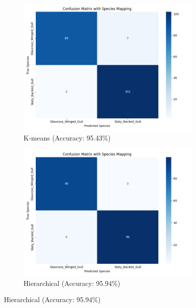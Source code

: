 \documentclass[a4paper,12pt]{report}
\begin{document}
\begin{figure}[H]
    \centering
    \begin{subfigure}[b]{0.32\textwidth}
        \centering
        \includegraphics[width=\textwidth]{images/clustering/kmeans_confusion_matrix.png}
        \caption{K-means (Accuracy: 95.43\%)}
        \label{fig:kmeans_cm}
    \end{subfigure}
    \hfill
    \begin{subfigure}[b]{0.32\textwidth}
        \centering
        \includegraphics[width=\textwidth]{images/clustering/hierarchical_confusion_matrix.png}
        \caption{Hierarchical (Accuracy: 95.94\%)}
        \label{fig:hierarchical_cm}
    \end{subfigure}

\end{figure}
\end{document}
